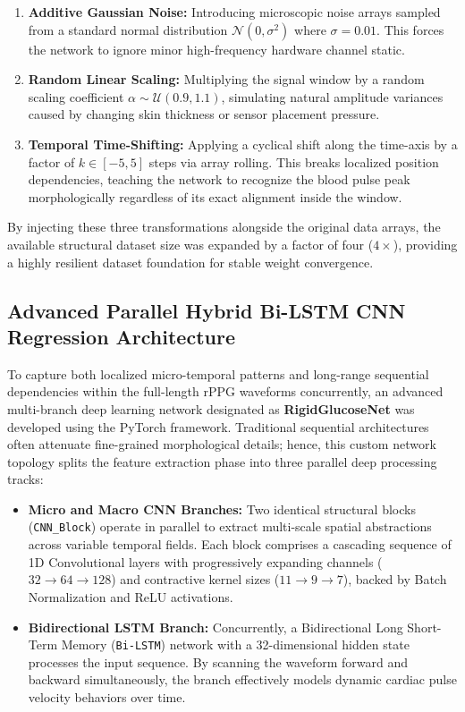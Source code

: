 \begin{enumerate}
    \item \textbf{Additive Gaussian Noise:} Introducing microscopic noise arrays sampled from a standard normal distribution $\mathcal{N}(0, \sigma^2)$ where $\sigma = 0.01$. This forces the network to ignore minor high-frequency hardware channel static.
    \item \textbf{Random Linear Scaling:} Multiplying the signal window by a random scaling coefficient $\alpha \sim \mathcal{U}(0.9, 1.1)$, simulating natural amplitude variances caused by changing skin thickness or sensor placement pressure.
    \item \textbf{Temporal Time-Shifting:} Applying a cyclical shift along the time-axis by a factor of $k \in [-5, 5]$ steps via array rolling. This breaks localized position dependencies, teaching the network to recognize the blood pulse peak morphologically regardless of its exact alignment inside the window.
\end{enumerate}

By injecting these three transformations alongside the original data arrays, the available structural dataset size was expanded by a factor of four ($4\times$), providing a highly resilient dataset foundation for stable weight convergence.

\subsection{Advanced Parallel Hybrid Bi-LSTM CNN Regression Architecture}
To capture both localized micro-temporal patterns and long-range sequential dependencies within the full-length rPPG waveforms concurrently, an advanced multi-branch deep learning network designated as \textbf{RigidGlucoseNet} was developed using the PyTorch framework. Traditional sequential architectures often attenuate fine-grained morphological details; hence, this custom network topology splits the feature extraction phase into three parallel deep processing tracks:

\begin{itemize}
    \item \textbf{Micro and Macro CNN Branches:} Two identical structural blocks (\texttt{CNN\_Block}) operate in parallel to extract multi-scale spatial abstractions across variable temporal fields. Each block comprises a cascading sequence of 1D Convolutional layers with progressively expanding channels ($32 \to 64 \to 128$) and contractive kernel sizes ($11 \to 9 \to 7$), backed by Batch Normalization and ReLU activations.
    \item \textbf{Bidirectional LSTM Branch:} Concurrently, a Bidirectional Long Short-Term Memory (\texttt{Bi-LSTM}) network with a 32-dimensional hidden state processes the input sequence. By scanning the waveform forward and backward simultaneously, the branch effectively models dynamic cardiac pulse velocity behaviors over time.
\end{itemize}

